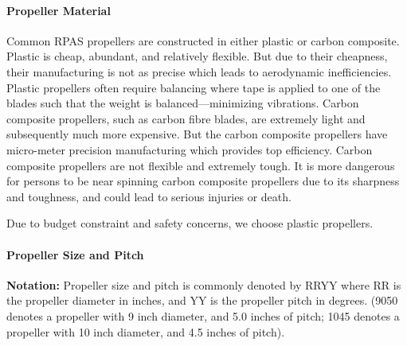 \paragraph{Propeller Material}

Common RPAS propellers are constructed in either plastic or carbon composite. Plastic is cheap, abundant, 
and relatively flexible. But due to their cheapness, their manufacturing is not as precise which leads to 
aerodynamic inefficiencies. Plastic propellers often require balancing where tape is applied to one of the 
blades such that the weight is balanced---minimizing vibrations. Carbon composite propellers, such as 
carbon fibre blades, are extremely light and subsequently much more expensive. But the carbon composite 
propellers have micro-meter precision manufacturing which provides top efficiency. Carbon composite 
propellers are not flexible and extremely tough. It is more dangerous for persons to be near spinning 
carbon composite propellers due to its sharpness and toughness, and could lead to serious injuries or death.

Due to budget constraint and safety concerns, we choose plastic propellers.

\paragraph{Propeller Size and Pitch}

\textbf{Notation: } Propeller size and pitch is commonly denoted by RRYY where RR is the propeller diameter in inches, and YY is the propeller pitch in degrees. (9050 denotes a propeller with 9 inch diameter, and 5.0 inches of pitch; 1045 denotes a propeller with 10 inch diameter, and 4.5 inches of pitch).

